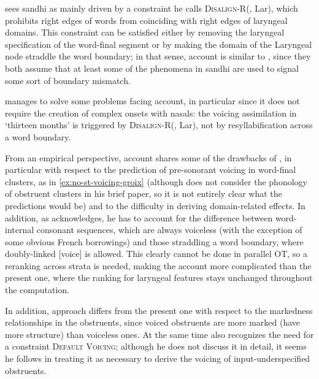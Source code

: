 \citet{hall09:_laryn_breton} sees sandhi as mainly driven by a constraint he calls \textsc{Disalign-R}(\owd, Lar), which prohibits right edges of words from coinciding with right edges of laryngeal domains. This constraint can be satisfied either by removing the laryngeal specification of the word\hyp final segment or by making the domain of the Laryngeal node straddle the word boundary; in that sense,  account is similar to , since they both assume that at least some of the phenomena in sandhi are used to signal some sort of boundary mismatch.

\citet{hall09:_laryn_breton} manages to solve some problems facing  account, in particular since it does not require the creation of complex onsets with nasals: the voicing assimilation in  `thirteen months' is triggered by \textsc{Disalign-R}(\owd, Lar), not by resyllabification across a word boundary.

From an empirical perspective,  account shares some of the drawbacks of , in particular with respect to the prediction of pre\hyp sonorant voicing in word\hyp final clusters, as in \cref{ex:no-st-voicing-groix} (although \citeauthor{hall09:_laryn_breton} does not consider the phonology of obstruent clusters in his brief paper, so it is not entirely clear what the predictions would be) and to the difficulty in deriving domain\hyp related effects. In addition, as \citet{hall09:_laryn_breton} acknowledges, he has to account for the difference between word\hyp internal consonant sequences, which are always voiceless (with the exception of some obvious French borrowings) and those straddling a word boundary, where doubly\hyp linked [voice] is allowed. This clearly cannot be done in parallel OT, so a reranking across strata is needed, making the account more complicated than the present one, where the ranking for laryngeal features stays unchanged throughout the computation.

In addition,  approach differs from the present one with respect to the markedness relationships in the obstruents, since voiced obstruents are more marked (have more structure) than voiceless ones. At the same time \citet{hall09:_laryn_breton} also recognizes the need for a constraint \textsc{Default Voicing}; although he does not discuss it in detail, it seems he follows \citet{kramer-breton} in treating it as necessary to derive the voicing of input\hyp underspecified obstruents.

